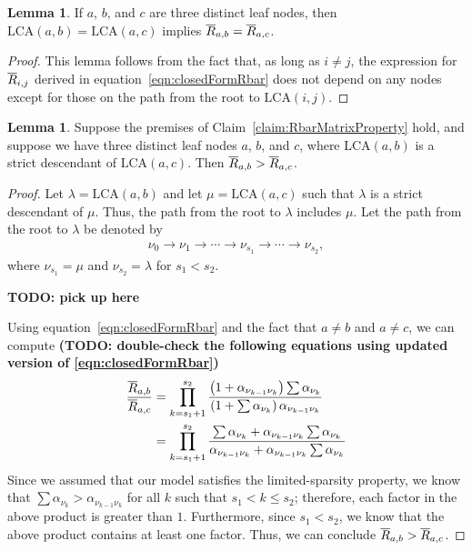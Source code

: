 \documentclass{article}
\theoremstyle{definition}
\newtheorem{lemma}[thm]{Lemma}
\begin{document}
\begin{lemma}
If $a$, $b$, and $c$ are three distinct leaf nodes, then $\text{LCA}(a,b) = \text{LCA}(a,c)$ implies $\overline{R}_{a,b} = \overline{R}_{a,c}$.
\label{lemma:equalLCA}
\end{lemma}

\begin{proof}
This lemma follows from the fact that, as long as $i \neq j$, the expression for $\overline{R}_{i,j}$ derived in equation~\eqref{eqn:closedFormRbar} does not depend on any nodes except for those on the path from the root to $\text{LCA}(i,j)$.
\end{proof}

\begin{lemma}
Suppose the premises of Claim~\ref{claim:RbarMatrixProperty} hold, and suppose we have three distinct leaf nodes $a$, $b$, and $c$, where $\text{LCA}(a,b)$ is a strict descendant of $\text{LCA}(a,c)$.
Then $\overline{R}_{a,b} > \overline{R}_{a,c}$.
\label{lemma:greaterLCA}
\end{lemma}

\begin{proof}
Let $\lambda = \text{LCA}(a,b)$ and let $\mu = \text{LCA}(a,c)$ such that $\lambda$ is a strict descendant of $\mu$.
Thus, the path from the root to $\lambda$ includes $\mu$.
Let the path from the root to $\lambda$ be denoted by
\begin{align}
\nu_0 \to \nu_1 \to \cdots \to \nu_{s_1} \to \cdots \to \nu_{s_2},
\end{align}
where $\nu_{s_1} = \mu$ and $\nu_{s_2} = \lambda$ for $s_1 < s_2$.

\par {\bf TODO: pick up here} \par

Using equation~\eqref{eqn:closedFormRbar} and the fact that $a \neq b$ and $a \neq c$, we can compute
{\bf (TODO: double-check the following equations using updated version of \eqref{eqn:closedFormRbar})}
\begin{align}
\frac{\overline{R}_{a,b}}{\overline{R}_{a,c}}
&=
\prod_{k=s_1+1}^{s_2}
\frac
  { \left( 1 + \alpha_{\nu_{k-1} \nu_k} \right) \sum \alpha_{\nu_k} }
  { \left( 1 + \sum \alpha_{\nu_k} \right) \alpha_{\nu_{k-1} \nu_k} }
\\
&=
\prod_{k=s_1+1}^{s_2}
\frac
  { \sum \alpha_{\nu_k} + \alpha_{\nu_{k-1} \nu_k} \sum \alpha_{\nu_k} }
  { \alpha_{\nu_{k-1} \nu_k} + \alpha_{\nu_{k-1} \nu_k} \sum \alpha_{\nu_k} }
\end{align}
%
Since we assumed that our model satisfies the limited-sparsity property, we know that $\sum \alpha_{\nu_k} > \alpha_{\nu_{k-1} \nu_k}$ for all $k$ such that $s_1 < k \leq s_2$; therefore, each factor in the above product is greater than $1$.
Furthermore, since $s_1 < s_2$, we know that the above product contains at least one factor.
Thus, we can conclude $\overline{R}_{a,b} > \overline{R}_{a,c}$.
\end{proof}
\end{document}
